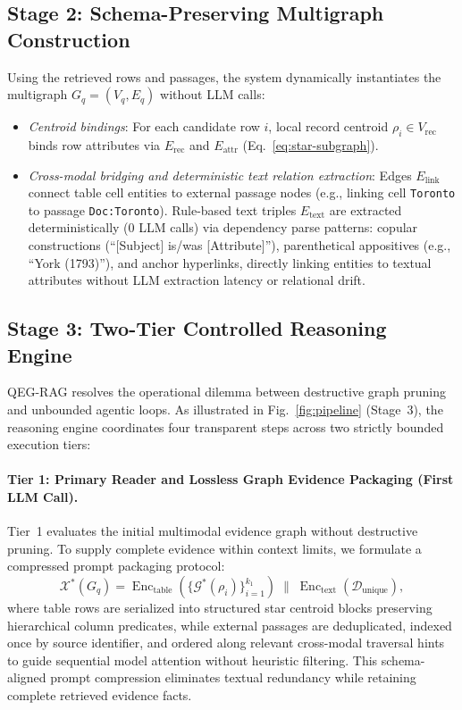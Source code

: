 \documentclass[runningheads]{llncs}
\begin{document}
\enlargethispage{2.5\baselineskip}
\subsection{Stage 2: Schema-Preserving Multigraph Construction}
\label{sec:method-kg}
Using the retrieved rows and passages, the system dynamically instantiates the multigraph $G_q=(V_q, E_q)$ without LLM calls:
\begin{itemize}[leftmargin=1.5em]
    \item \emph{Centroid bindings}: For each candidate row $i$, local record centroid $\rho_i \in V_{\text{rec}}$ binds row attributes via $E_{\text{rec}}$ and $E_{\text{attr}}$ (Eq.~\ref{eq:star-subgraph}).
    \item \emph{Cross-modal bridging and deterministic text relation extraction}: Edges $E_{\text{link}}$ connect table cell entities to external passage nodes (e.g., linking cell \texttt{Toronto} to passage \texttt{Doc:Toronto}). Rule-based text triples $E_{\text{text}}$ are extracted deterministically (0 LLM calls) via dependency parse patterns: copular constructions (``[Subject] is/was [Attribute]''), parenthetical appositives (e.g., ``York (1793)''), and anchor hyperlinks, directly linking entities to textual attributes without LLM extraction latency or relational drift.
\end{itemize}

\subsection{Stage 3: Two-Tier Controlled Reasoning Engine}
\label{sec:method-engine}


QEG-RAG resolves the operational dilemma between destructive graph pruning and unbounded agentic loops. As illustrated in Fig.~\ref{fig:pipeline} (Stage~3), the reasoning engine coordinates four transparent steps across two strictly bounded execution tiers:

\paragraph{Tier 1: Primary Reader and Lossless Graph Evidence Packaging (First LLM Call).}
Tier~1 evaluates the initial multimodal evidence graph without destructive pruning. To supply complete evidence within context limits, we formulate a compressed prompt packaging protocol:
\begin{equation}
\label{eq:compression}
\mathcal{X}^*(G_q) = \operatorname{Enc}_{\text{table}}\left(\{\mathcal{G}^*(\rho_i)\}_{i=1}^{k_1}\right) \;\parallel\; \operatorname{Enc}_{\text{text}}(\mathcal{D}_{\text{unique}}),
\end{equation}
where table rows are serialized into structured star centroid blocks preserving hierarchical column predicates, while external passages are deduplicated, indexed once by source identifier, and ordered along relevant cross-modal traversal hints to guide sequential model attention without heuristic filtering. This schema-aligned prompt compression eliminates textual redundancy while retaining complete retrieved evidence facts.
\end{document}

